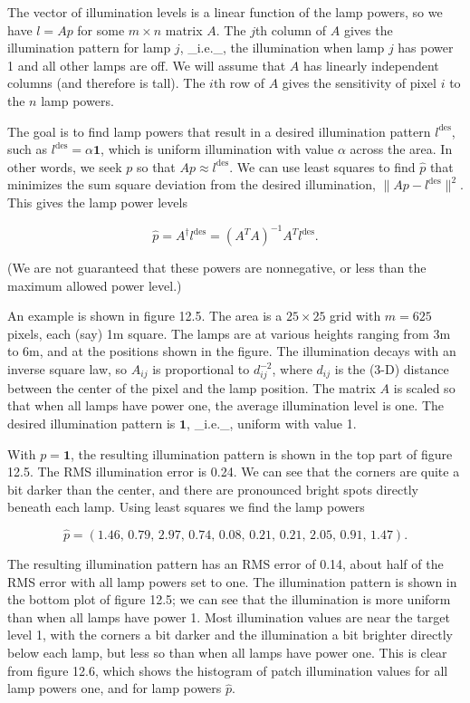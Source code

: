 The vector of illumination levels is a linear function of the lamp powers, so we have \(l=Ap\) for some \(m\times n\) matrix \(A\). The \(j\)th column of \(A\) gives the illumination pattern for lamp \(j\), _i.e._, the illumination when lamp \(j\) has power 1 and all other lamps are off. We will assume that \(A\) has linearly independent columns (and therefore is tall). The \(i\)th row of \(A\) gives the sensitivity of pixel \(i\) to the \(n\) lamp powers.

The goal is to find lamp powers that result in a desired illumination pattern \(l^{\text{des}}\), such as \(l^{\text{des}}=\alpha\mathbf{1}\), which is uniform illumination with value \(\alpha\) across the area. In other words, we seek \(p\) so that \(Ap\approx l^{\text{des}}\). We can use least squares to find \(\hat{p}\) that minimizes the sum square deviation from the desired illumination, \(\|Ap-l^{\text{des}}\|^{2}\). This gives the lamp power levels

\[\hat{p}=A^{\dagger}l^{\text{des}}=(A^{T}A)^{-1}A^{T}l^{\text{des}}.\]

(We are not guaranteed that these powers are nonnegative, or less than the maximum allowed power level.)

An example is shown in figure 12.5. The area is a \(25\times 25\) grid with \(m=625\) pixels, each (say) 1m square. The lamps are at various heights ranging from 3m to 6m, and at the positions shown in the figure. The illumination decays with an inverse square law, so \(A_{ij}\) is proportional to \(d_{ij}^{-2}\), where \(d_{ij}\) is the (3-D) distance between the center of the pixel and the lamp position. The matrix \(A\) is scaled so that when all lamps have power one, the average illumination level is one. The desired illumination pattern is \(\mathbf{1}\), _i.e._, uniform with value 1.

With \(p=\mathbf{1}\), the resulting illumination pattern is shown in the top part of figure 12.5. The RMS illumination error is 0.24. We can see that the corners are quite a bit darker than the center, and there are pronounced bright spots directly beneath each lamp. Using least squares we find the lamp powers

\[\hat{p}=(1.46,\,0.79,\,2.97,\,0.74,\,0.08,\,0.21,\,0.21,\,2.05,\,0.91,\,1.47).\]

The resulting illumination pattern has an RMS error of 0.14, about half of the RMS error with all lamp powers set to one. The illumination pattern is shown in the bottom plot of figure 12.5; we can see that the illumination is more uniform than when all lamps have power 1. Most illumination values are near the target level 1, with the corners a bit darker and the illumination a bit brighter directly below each lamp, but less so than when all lamps have power one. This is clear from figure 12.6, which shows the histogram of patch illumination values for all lamp powers one, and for lamp powers \(\hat{p}\).

 